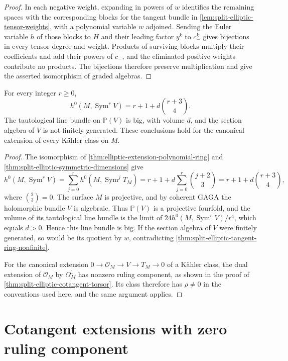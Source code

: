 \begin{proof}
In each negative weight, expanding in powers of $w$ identifies the remaining spaces with the corresponding blocks for the tangent bundle in \cref{lem:split-elliptic-tensor-weights}, with a polynomial variable $w$ adjoined. Sending the Euler variable $h$ of those blocks to $H$ and their leading factor $y^k$ to $c_-^k$ gives bijections in every tensor degree and weight. Products of surviving blocks multiply their coefficients and add their powers of $c_-$, and the eliminated positive weights contribute no products. The bijections therefore preserve multiplication and give the asserted isomorphism of graded algebras.
\end{proof}

\begin{corollary}\label{cor:elliptic-extension-symmetric-dimensions}
For every integer $r\geq0$,
\[
 h^0(M,\operatorname{Sym}^rV)
       =r+1+d\binom{r+3}{4}.
\]
The tautological line bundle on $\mathbb P(V)$ is big, with volume $d$, and the section algebra of $V$ is not finitely generated. These conclusions hold for the canonical extension of every K\"ahler class on $M$.
\end{corollary}
\begin{proof}
The isomorphism of \cref{thm:elliptic-extension-polynomial-ring} and \cref{thm:split-elliptic-symmetric-dimensions} give
\[
 h^0(M,\operatorname{Sym}^rV)
 =\sum_{j=0}^r h^0(M,\operatorname{Sym}^jT_M)
 =r+1+d\sum_{j=0}^r\binom{j+2}{3}
 =r+1+d\binom{r+3}{4},
\]
where $\binom{2}{3}=0$. The surface $M$ is projective, and by coherent GAGA the holomorphic bundle $V$ is algebraic. Thus $\mathbb P(V)$ is a projective fourfold, and the volume of its tautological line bundle is the limit of $24h^0(M,\operatorname{Sym}^rV)/r^4$, which equals $d>0$. Hence this line bundle is big. If the section algebra of $V$ were finitely generated, so would be its quotient by $w$, contradicting \cref{thm:split-elliptic-tangent-ring-nonfinite}.

For the canonical extension $0\to\mathcal O_M\to V\to T_M\to0$ of a K\"ahler class, the dual extension of $\mathcal O_M$ by $\Omega^1_M$ has nonzero ruling component, as shown in the proof of \cref{thm:split-elliptic-cotangent-torsor}. Its class therefore has $\rho\ne0$ in the conventions used here, and the same argument applies.
\end{proof}

\section{Cotangent extensions with zero ruling component}
\label{subsec:elliptic-zero-ruling-extension}

